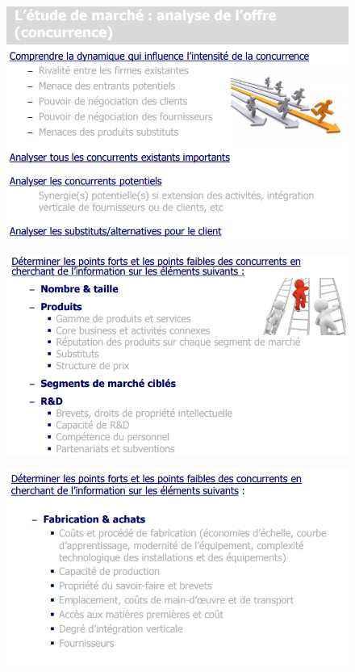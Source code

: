 \documentclass{article}
\begin{document}
\begin{figure}[H]
	\centering
	\includegraphics[width=14cm]{etudeConcurrence1.png}
\end{figure}
\begin{figure}[H]
	\centering
	\includegraphics[width=14cm]{etudeConcurrence2.png}
\end{figure}
\begin{figure}[H]
	\centering
	\includegraphics[width=14cm]{etudeConcurrence3.png}
\end{figure}
\end{document}
